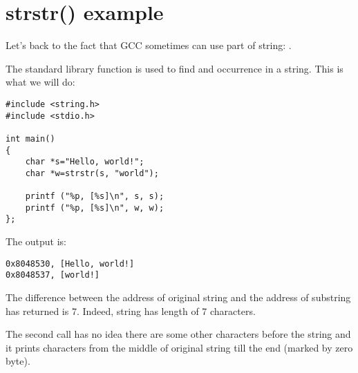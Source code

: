 \chapter{strstr() example}
\label{strstr_example}

Let's back to the fact that GCC sometimes can use part of string: .

The  \CCpp standard library function is used to find and occurrence in a string.
This is what we will do:

\begin{lstlisting}
#include <string.h>
#include <stdio.h>

int main()
{
	char *s="Hello, world!";
	char *w=strstr(s, "world");

	printf ("%p, [%s]\n", s, s);
	printf ("%p, [%s]\n", w, w);
};
\end{lstlisting}

The output is:

\begin{lstlisting}
0x8048530, [Hello, world!]
0x8048537, [world!]
\end{lstlisting}

The difference between the address of original string and the address of substring  has returned is 7.
Indeed,  string has length of 7 characters.

The second \printf call has no idea there are some other characters before the string and it prints characters
from the middle of original string till the end (marked by zero byte).

